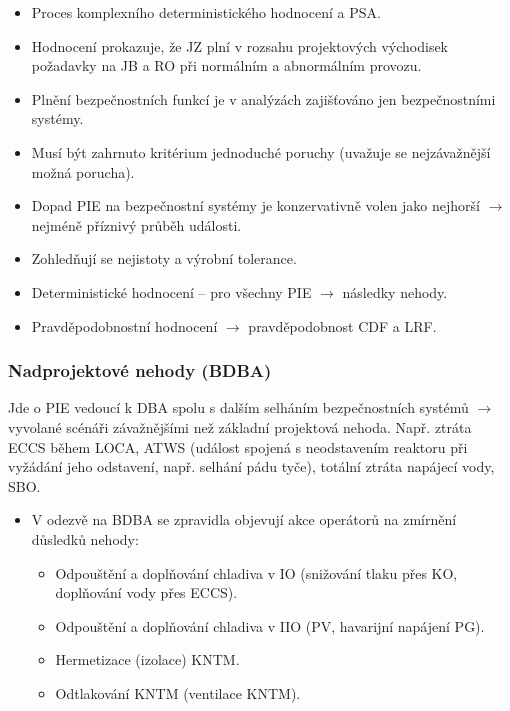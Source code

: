 \begin{itemize}
    \item Proces komplexního deterministického hodnocení a PSA.
    \item Hodnocení prokazuje, že JZ plní v rozsahu projektových východisek požadavky na JB a RO při normálním a abnormálním provozu.
    \item Plnění bezpečnostních funkcí je v analýzách zajišťováno jen bezpečnostními systémy.
    \item Musí být zahrnuto kritérium jednoduché poruchy (uvažuje se nejzávažnější možná porucha).
    \item Dopad PIE na bezpečnostní systémy je konzervativně volen jako nejhorší $\rightarrow$ nejméně příznivý průběh události.
    \item Zohledňují se nejistoty a výrobní tolerance.
    \item Deterministické hodnocení -- pro všechny PIE $\rightarrow$ následky nehody.
    \item Pravděpodobnostní hodnocení $\rightarrow$ pravděpodobnost CDF a LRF.
\end{itemize}

\subsubsection{Nadprojektové nehody (BDBA)}

Jde o PIE vedoucí k DBA spolu s dalším selháním bezpečnostních systémů $\rightarrow$ vyvolané scénáři závažnějšími než základní projektová nehoda. Např. ztráta ECCS během LOCA, ATWS (událost spojená s neodstavením reaktoru při vyžádání jeho odstavení, např. selhání pádu tyče), totální ztráta napájecí vody, SBO.

\begin{itemize}
    \item V odezvě na BDBA se zpravidla objevují akce operátorů na zmírnění důsledků nehody:
    \begin{itemize}
        \item Odpouštění a doplňování chladiva v IO (snižování tlaku přes KO, doplňování vody přes ECCS).
        \item Odpouštění a doplňování chladiva v IIO (PV, havarijní napájení PG).
        \item Hermetizace (izolace) KNTM.
        \item Odtlakování KNTM (ventilace KNTM).
    \end{itemize}
\end{itemize}

